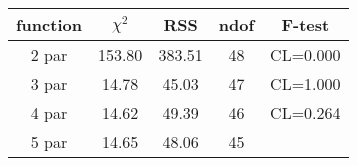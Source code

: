 \begin{tabular}{c|c|c|c|c}
function & $\chi^2$ & RSS & ndof & F-test \\
\hline
2 par & 153.80 & 383.51 & 48 & CL=0.000 \\
3 par & 14.78 & 45.03 & 47 & CL=1.000 \\
4 par & 14.62 & 49.39 & 46 & CL=0.264 \\
5 par & 14.65 & 48.06 & 45 & \\
\hline
\end{tabular}